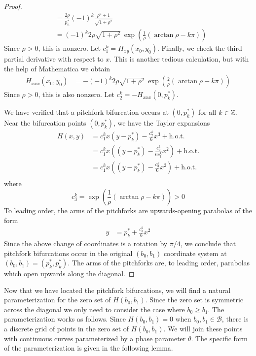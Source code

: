 \documentclass[thesis.tex]{subfiles}
\begin{document}
\begin{lemma}
\begin{proof}
\begin{align*}
&= \frac{2 \rho}{p_n^*} (-1)^k \frac{\rho^2 + 1}{\sqrt{1 + \rho^2}} \\
&= (-1)^k 2 \rho \sqrt{1 + \rho^2} \: \exp{\left(\frac{1}{\rho} (\arctan \rho - k \pi) \right)}
\end{align*}
Since $\rho > 0$, this is nonzero. Let $c_1^k = H_{xy}(x_0, y_0)$. Finally, we check the third partial derivative with respect to $x$. This is another tedious calculation, but with the help of Mathematica we obtain
\begin{align*}
H_{xxx}(x_0, y_0)
&= -(-1)^k 2 \rho \sqrt{1 + \rho^2} \: \exp{\left(\frac{2}{\rho} (\arctan \rho - k \pi) \right)}
\end{align*}
Since $\rho > 0$, this is also nonzero. Let $c_2^k = -H_{xxx}(0, p^*_k)$.

We have verified that a pitchfork bifurcation occurs at $(0, p^*_k)$ for all $k \in \mathbb{Z}$. Near the bifurcation points $(0, p_k^*)$, we have the Taylor expansions
\begin{align*}
H(x, y) &= c_1^k x (y - p_k^*) - \frac{c_2^k}{6} x^3 + \text{h.o.t.} \\
&= c_1^k x \left( (y - p_k^*) - \frac{c_2^k}{6 c_1^k } x^2 \right) + \text{h.o.t.} \\
&= c_1^k x \left( (y - p_k^*) - \frac{c_3^k}{6} x^2 \right) + \text{h.o.t.} \\
\end{align*}
where
\begin{equation*}
c_3^k = \exp{\left(\frac{1}{\rho} (\arctan \rho - k \pi) \right)} > 0
\end{equation*}
To leading order, the arms of the pitchforks are upwards-opening parabolas of the form 
\begin{align*}
y &= p_k^* + \frac{c_3^k}{6} x^2
\end{align*}
Since the above change of coordinates is a rotation by $\pi/4$, we conclude that pitchfork bifurcations occur in the original $(b_0, b_1)$ coordinate system at $(b_0, b_1) = (p_k^*, p_k^*)$. The arms of the pitchforks are, to leading order, parabolas which open upwards along the diagonal.
\end{proof}
\end{lemma}

Now that we have located the pitchfork bifurcations, we will find a natural parameterization for the zero set of $H(b_0, b_1)$. Since the zero set is symmetric across the diagonal we only need to consider the case where $b_0 \geq b_1$. The parameterization works as follows. Since $H(b_0, b_1) = 0$ when $b_0, b_1 \in \mathcal{B}$, there is a discrete grid of points in the zero set of $H(b_0, b_1)$. We will join these points with continuous curves parameterized by a phase parameter $\theta$. The specific form of the parameterization is given in the following lemma.
\end{document}
